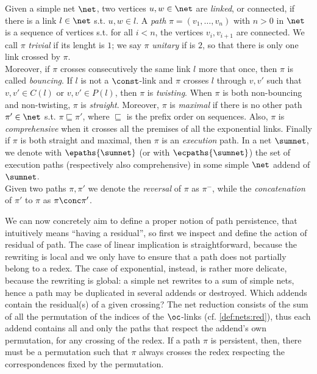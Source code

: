 \begin{definition}[Path] \label{def:path}
  Given a simple net $\net$, two vertices $u, w \in \net$ are \textit{linked}, 
  or connected, if there is a link $l \in \net$ s.t.  $u,w \in l$.
  A \textit{path} $\pi = (v_1, \ldots, v_n)$ with $n>0$ in $\net$
  is a sequence of vertices s.t.
    for all $i < n$,
    the vertices $v_i, v_{i+1}$ are connected.
  We call $\pi$ \textit{trivial} if its lenght is $1$; 
  we say $\pi$ \textit{unitary} if is $2$, so that there is only one link
  crossed by $\pi$.
  \\
  Moreover, if $\pi$ crosses consecutively the same link $l$ more that once, 
  then $\pi$ is called \textit{bouncing}.
  If $l$ is not a $\const$-link and $\pi$ crosses $l$ through $v,v'$ such that
    $v,v' \in C(l)$ or $v,v' \in P(l)$,
  then $\pi$ is \textit{twisting}.
  When $\pi$ is both non-bouncing and non-twisting, $\pi$ is \textit{straight}.
  Moreover, $\pi$ is \textit{maximal} if there is no other path
  $\pi' \in \net$ s.t. $\pi \sqsubseteq \pi'$, where $\sqsubseteq$ is the 
  prefix order on sequences.
  Also, $\pi$ is \textit{comprehensive} when it crosses all the premises of all 
  the exponential links.
  Finally if $\pi$ is both straight and maximal, then $\pi$ is an 
  \textit{execution} path.
  In a net $\sumnet$, we denote with $\epaths{\sumnet}$
  (or with $\ecpaths{\sumnet}$) 
  the set of execution paths (respectively also comprehensive)
  in some simple $\net$ addend of $\sumnet$.
  \\
  Given two paths $\pi,\pi'$
  we denote the \textit{reversal} of $\pi$ as $\pi^-$,
  while the \textit{concatenation} of $\pi'$ to $\pi$ as $\pi \conc \pi'$.
\end{definition}

We can now concretely aim to define a proper notion of path persistence, that 
intuitively means ``having a residual'', so first we inspect and define the 
action of residual of path.
The case of linear implication is straightforward, because the rewriting is 
local and we only have to ensure that a path does not partially belong to 
a redex.
The case of exponential, instead, is rather more delicate, because the 
rewriting is global: a simple net rewrites to a sum of simple nets, hence a 
path may be duplicated in several addends or destroyed.
Which addends contain the residual(s) of a given crossing?
The net reduction consists of the sum of all the permutation of the indices of 
the $\oc$-links (cf. \autoref{def:nets:red}), thus each addend contains all 
and only the paths that respect the addend's own permutation, for any crossing 
of the redex.
If a path $\pi$ is persistent, then, there must be a permutation such that 
$\pi$ always crosses the redex respecting the correspondences fixed by the 
permutation.




